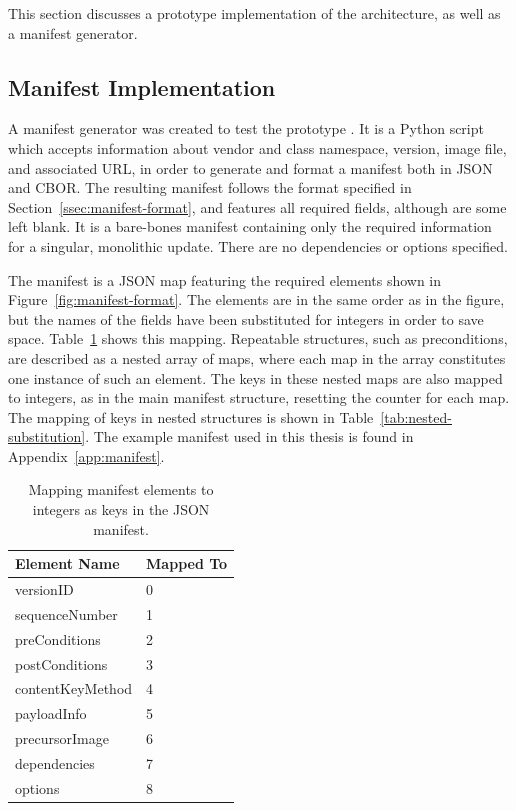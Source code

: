 \documentclass[0-thesis.tex]{subfiles}
\begin{document}
This section discusses a prototype implementation of the architecture, as well as a
manifest generator. 

\subsection{Manifest Implementation}
\label{ssec:manifest-implementation}
A manifest generator was created to test the prototype \parencite{manifest-generator}. It
is a Python script which accepts information about vendor and class namespace, version,
image file, and associated URL, in order to generate and format a manifest both in JSON
and CBOR. The resulting manifest follows the format specified in
Section~\ref{ssec:manifest-format}, and features all required fields, although are some
left blank. It is a bare-bones manifest containing only the required information for a
singular, monolithic update. There are no dependencies or options specified.

The manifest is a JSON map featuring the required elements shown in
Figure~\ref{fig:manifest-format}. The elements are in the same order as in the figure, but
the names of the fields have been substituted for integers in order to save space.
Table~\ref{tab:manifest-substitution} shows this mapping. Repeatable structures, such as
preconditions, are described as a nested array of maps, where each map in the array
constitutes one instance of such an element. The keys in these nested maps are also mapped
to integers, as in the main manifest structure, resetting the counter for each map. The
mapping of keys in nested structures is shown in Table~\ref{tab:nested-substitution}. The
example manifest used in this thesis is found in Appendix~\ref{app:manifest}. 

\begin{longtable}[]{@{}ll@{}}
    \caption{Mapping manifest elements to integers as keys in the JSON manifest.}
    \label{tab:manifest-substitution}\\
    \toprule
    Element Name & Mapped To\tabularnewline
    \midrule
    \endhead
    versionID & 0\tabularnewline
    sequenceNumber & 1\tabularnewline
    preConditions & 2\tabularnewline
    postConditions & 3\tabularnewline
    contentKeyMethod & 4\tabularnewline
    payloadInfo & 5\tabularnewline
    precursorImage & 6\tabularnewline
    dependencies & 7\tabularnewline
    options & 8\tabularnewline
    \bottomrule
\end{longtable}
\end{document}
